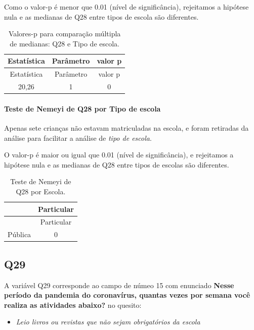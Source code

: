 \documentclass[]{article}
\providecommand{\tightlist}{%
  \setlength{\itemsep}{0pt}\setlength{\parskip}{0pt}}
\let\oldparagraph\paragraph
\renewcommand{\paragraph}[1]{\oldparagraph{#1}\mbox{}}
\begin{document}
Como o valor-p é menor que 0.01 (nível de significância), rejeitamos a hipótese nula e as medianas de Q28 entre tipos de escola são diferentes.

\begin{longtable}[]{@{}ccc@{}}
\caption{\label{tab:unnamed-chunk-886}Valores-p para comparação múltipla de medianas: Q28 e Tipo de escola.}\tabularnewline
\toprule
Estatística & Parâmetro & valor p\tabularnewline
\midrule
\endfirsthead
\toprule
Estatística & Parâmetro & valor p\tabularnewline
\midrule
\endhead
20,26 & 1 & 0\tabularnewline
\bottomrule
\end{longtable}

\hypertarget{teste-de-nemeyi-de-q28-por-tipo-de-escola}{%
\paragraph{Teste de Nemeyi de Q28 por Tipo de escola}\label{teste-de-nemeyi-de-q28-por-tipo-de-escola}}

Apenas sete crianças não estavam matriculadas na escola, e foram retiradas da análise para facilitar a análise de \emph{tipo de escola}.

O valor-p é maior ou igual que 0.01 (nível de significância), e rejeitamos a hipótese nula e as medianas de Q28 entre tipos de escolas são diferentes.

\begin{longtable}[]{@{}lc@{}}
\caption{\label{tab:unnamed-chunk-888}Teste de Nemeyi de Q28 por Escola.}\tabularnewline
\toprule
& Particular\tabularnewline
\midrule
\endfirsthead
\toprule
& Particular\tabularnewline
\midrule
\endhead
Pública & 0\tabularnewline
\bottomrule
\end{longtable}

\cleardoublepage

\hypertarget{q29}{%
\subsection{Q29}\label{q29}}

A variável Q29 corresponde ao campo de númeo 15 com enunciado \textbf{Nesse período da pandemia do coronavírus, quantas vezes por semana você realiza as atividades abaixo?} no quesito:

\begin{itemize}
\tightlist
\item
  \emph{Leio livros ou revistas que não sejam obrigatórios da escola}
\end{itemize}
\end{document}
